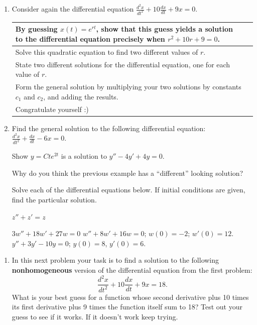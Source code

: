 \begin{enumerate}
\clearpage

\item Consider again the differential equation $\displaystyle\frac{d^2x}{dt^2}+10\frac{dx}{dt}+9x=0$. \label{07problem6}

\begin{tabular}{|p{2.5in}|p{3in}|}
\hline
By guessing $x(t) = e^{rt}$, show that this guess yields a solution to the differential equation precisely when $r^2 + 10r + 9 = 0$. \vspace{2.25in} &  \\ \hline
Solve this quadratic equation to find two different values of $r$. \vspace{1.25in} &  \\ \hline
State two different solutions for the differential equation, one for each value of $r$. &  \\ \hline
Form the general solution by multiplying your two solutions by constants $c_1$ and $c_2$, and adding the results. &  \\ \hline
Congratulate yourself :) &  \\ \hline
\end{tabular}

\item Find the general solution to the following differential equation: $\displaystyle\frac{d^2x}{dt^2}+\frac{dx}{dt}-6x=0$. \label{07problem7}


\clearpage

\ii Show $y=Cte^{2t}$ is a solution to $y''-4y'+4y=0$. \vfill

\ii Why do you think the previous example has a ``different'' looking solution? \vspace{2in}


\noindent Solve each of the differential equations below. If initial conditions are given, find the particular solution. 

\ii $z''+z'=z$ \vfill %

\clearpage

\ii $3w''+18w'+27w=0$ \vfill %
\ii $w''+8w'+16w=0$; $w(0)=-2$; $w'(0)=12$.  \vfill %
\ii $y'' +3y'-10y=0$; $y(0)=8$, $y'(0)=6$. \vfill %


\end{enumerate}



\clearpage
{}
\begin{enumerate}%
\item In this next problem your task is to find a solution to the following \textbf{nonhomogeneous} version of the differential equation from the first problem:
\[
\frac{d^2x}{dt^2}+10\frac{dx}{dt}+9x=18.
\]
What is your best guess for a function whose second derivative plus 10 times its first derivative plus 9 times the function itself sum to 18? Test out your guess to see if it works. If it doesn't work keep trying. \label{07problem8}
\end{enumerate}
\clearpage

